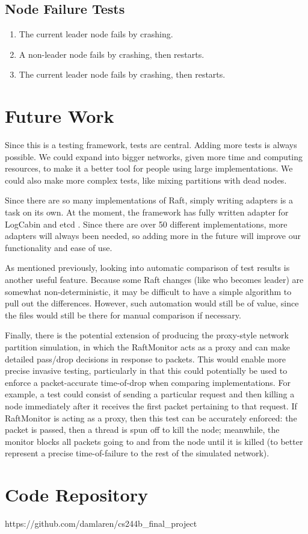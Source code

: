 \documentclass[UTF8]{article}
\begin{document}
\subsection{Node Failure Tests}
\begin{enumerate}
  \item The current leader node fails by crashing.
  \item A non-leader node fails by crashing, then restarts.
  \item The current leader node fails by crashing, then restarts. 
\end{enumerate}

\section{Future Work}
Since this is a testing framework, tests are central. Adding more tests is always possible. We could expand into bigger networks, given more time and computing resources, to make it a better tool for people using large implementations. We could also make more complex tests, like mixing partitions with dead nodes.

Since there are so many implementations of Raft, simply writing adapters is a task on its own. At the moment, the framework has fully written adapter for LogCabin \cite{logCabin} and etcd \cite{etcD}. Since there are over 50 different implementations, more adapters will always been needed, so adding more in the future will improve our functionality and ease of use.

As mentioned previously, looking into automatic comparison of test results is another useful feature. Because some Raft changes (like who becomes leader) are somewhat non-deterministic, it may be difficult to have a simple algorithm to pull out the differences. However, such automation would still be of value, since the files would still be there for manual comparison if necessary.

Finally, there is the potential extension of producing the proxy-style network partition simulation, in which the RaftMonitor acts as a proxy and can make detailed pass/drop decisions in response to packets. This would enable more precise invasive testing, particularly in that this could potentially be used to enforce a packet-accurate time-of-drop when comparing implementations. For example, a test could consist of sending a particular request and then killing a node immediately after it receives the first packet pertaining to that request. If RaftMonitor is acting as a proxy, then this test can be accurately enforced: the packet is passed, then a thread is spun off to kill the node; meanwhile, the monitor blocks all packets going to and from the node until it is killed (to better represent a precise time-of-failure to the rest of the simulated network).

\section{Code Repository}
https://github.com/damlaren/cs244b\_final\_project



\end{document}
